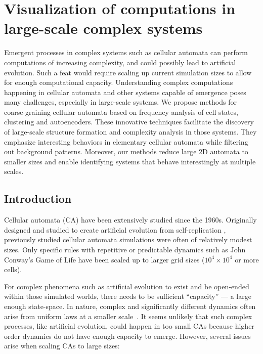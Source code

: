 \chapter{Visualization of computations in large-scale complex systems}
\label{cha:visu-comp-large}

Emergent processes in complex systems such as cellular automata can perform
computations of increasing complexity, and could possibly lead to artificial
evolution. Such a feat would require scaling up current simulation sizes to
allow for enough computational capacity. Understanding complex computations
happening in cellular automata and other systems capable of emergence poses many
challenges, especially in large-scale systems. We propose methods for
coarse-graining cellular automata based on frequency analysis of cell states,
clustering and autoencoders. These innovative techniques facilitate the
discovery of large-scale structure formation and complexity analysis in those
systems. They emphasize interesting behaviors in elementary cellular automata
while filtering out background patterns. Moreover, our methods reduce large 2D
automata to smaller sizes and enable identifying systems that behave
interestingly at multiple scales.

\section{Introduction}
Cellular automata (CA) have been extensively studied since the 1960s. Originally
designed and studied to create artificial evolution from self-replication
\parencite{vonneumannTheorySelfreproducingAutomata1966,
  langtonSelfreproductionCellularAutomata1984}, previously studied cellular
automata simulations were often of relatively modest sizes. Only specific rules
with repetitive or predictable dynamics such as John Conway's Game of Life
\parencite{gardnerMathematicalGames1970} have been scaled up to larger grid
sizes ($10^4 \times 10^4$ or more cells).

For complex phenomena such as artificial evolution to exist and be open-ended
within those simulated worlds, there needs to be sufficient ``capacity'' --- a
large enough state-space. In nature, complex and significantly different
dynamics often arise from uniform laws at a smaller
scale~\parencite{andersonMoreDifferent1972}. It seems unlikely that such complex
processes, like artificial evolution, could happen in too small CAs because
higher order dynamics do not have enough capacity to emerge. However, several
issues arise when scaling CAs to large sizes:

